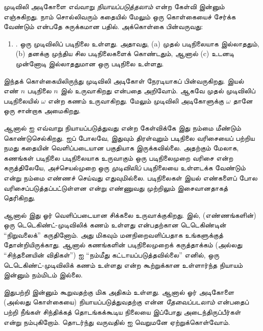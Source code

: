\documentclass[../../../include/open-logic-section]{subfiles}
\begin{document}
முடிவிலி அடிகோளை எவ்வாறு \emph{நியாயப்படுத்தலாம்} என்ற கேள்வி இன்னும்
எஞ்சுகிறது. நாம் சொல்லிவரும் கதையில் மேலும் ஒரு கொள்கையைச் சேர்க்க வேண்டும்
என்பதே சுருக்கமான பதில். அக்கொள்கை பின்வருவது:
\begin{enumerate}
	\item[] \stagesinf. ஒரு முடிவிலிப் படிநிலை உள்ளது. அதாவது, (a) முதல்
	படிநிலையாக இல்லாததும், (b) தனக்கு முந்திய சில படிநிலைகளைக் கொண்டதும்,
	ஆனால் (c) உடனடி முன்னோடி இல்லாததுமான ஒரு படிநிலை உள்ளது.
\end{enumerate}
இந்தக் கொள்கையிலிருந்து முடிவிலி அடிகோள் நேரடியாகப் பின்வருகிறது. இயல்
எண் $n$ படிநிலை $n$ இல் உருவாகிறது என்பதை அறிவோம். ஆகவே முதல் முடிவிலிப்
படிநிலையில் $\omega$ என்ற கணம் உருவாகிறது. மேலும் முடிவிலி அடிகோளுக்கு
$\omega$ தானே ஒரு சான்றாக அமைகிறது.

ஆனால் \stagesinf{} ஐ எவ்வாறு நியாயப்படுத்துவது என்ற கேள்விக்கே இது
நம்மை மீண்டும் கொண்டுசெல்கிறது. \stagessucc{} ஐப் போலவே, இதுவும்
திரள்வுறும் படிநிலை வரிசையைப் பற்றிய நமது கதையின் வெளிப்படையான பகுதியாக
இருக்கவில்லை. அதற்கும் மேலாக, கணங்கள் படிநிலை படிநிலையாக உருவாகும் ஒரு
படிநிலைமுறை வரிசை என்ற கருத்திலேயே, அச்செயல்முறை ஒரு \emph{முடிவிலிப்}
படிநிலையை உள்ளடக்க வேண்டும் என்று நம்மை எண்ணச் செய்வது எதுவுமில்லை.
படிநிலைகள் இயல் எண்களைப் போல வரிசைப்படுத்தப்பட்டுள்ளன என்று எண்ணுவது
முற்றிலும் இசைவானதாகத் தெரிகிறது.

ஆனால் இது ஓர் வெளிப்படையான சிக்கலை உருவாக்குகிறது.
 இல், (எண்ணங்களின்) ஒரு
டெடெகிண்ட்-முடிவிலிக் கணம் உள்ளது என்பதற்கான டெடெகிண்டின் ``நிறுவலைக்''
கருதினோம். அது மிகவும் மனநிறைவளிப்பதாக உங்களுக்குத் தோன்றியிருக்காது.
ஆனால் கணங்களின் படிநிலைமுறைக் கருத்தாக்கம் (அல்லது ``சிந்தனையின்
விதிகள்'') \stagesinf{} ஐ ``நம்மீது கட்டாயப்படுத்தவில்லை'' எனில்,
ஒரு டெடெகிண்ட்-முடிவிலிக் கணம் உள்ளது என்ற கூற்றுக்கான உள்ளார்ந்த
நியாயம் இன்னும் நம்மிடம் இல்லை.

இதுபற்றி இன்னும் கூறுவதற்கு மிக அதிகம் உள்ளது. ஆனால் ஓர் அடிகோளை
(அல்லது கொள்கையை) நியாயப்படுத்துவதற்கு என்ன \emph{தேவைப்படலாம்} என்பதைப்
பற்றி நீங்கள் சிந்திக்கத் தொடங்கக்கூடிய நிலையை இப்போது அடைந்திருப்பீர்கள்
என்று நம்புகிறோம். தொடர்ந்து வருவதில் \stagesinf{} ஐ வெறுமனே
ஏற்றுக்கொள்வோம்.
\end{document}
